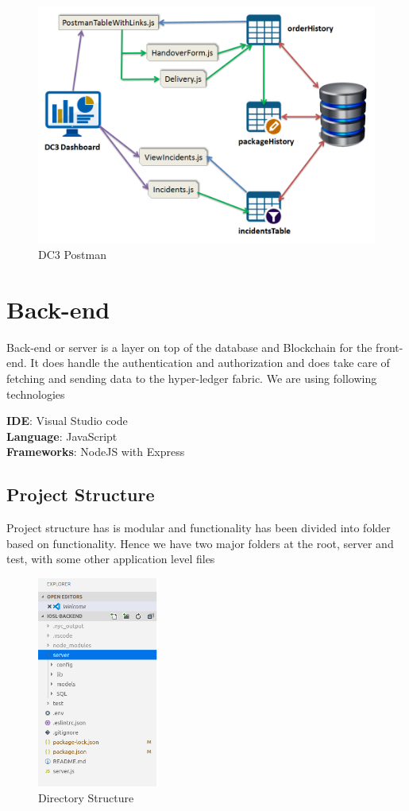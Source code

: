 \begin{figure}[htp]
    \centering
    \includegraphics[width=4 cm]{images/snet/DC3 Postman.png}
    \caption{DC3 Postman}
    \label{fig:}
\end{figure}



\section{Back-end}
Back-end or server is a layer on top of the database and Blockchain for the front-end. It does handle the authentication and authorization and does take care of fetching and sending data to the hyper-ledger fabric. We are using following technologies 

\textbf{IDE}: Visual Studio code\\
\textbf{Language}: JavaScript\\
\textbf{Frameworks}: NodeJS with Express



\subsection{Project Structure}
Project structure has is modular and functionality has been divided into folder based on functionality. Hence we have two major folders at the root, server and test, with some other application level files 


\begin{figure}[htp]
    \centering
    \includegraphics[width=4cm]{images/directystructure.png}
    \caption{Directory Structure}
    \label{fig:}
\end{figure}

